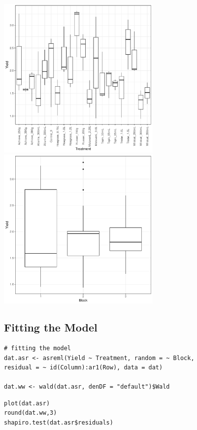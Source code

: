 \documentclass[a4paper, 10pt, fleqn, twosided]{memoir}
\begin{document}
\begin{tcolorbox}[title = Example 6 Boxplots]
\includegraphics[width=0.6\textwidth, frame]{example6_Treatboxplot.pdf}
\tcblower
\includegraphics[width=0.6\textwidth, frame]{example6_Blockboxplot.pdf}
\end{tcolorbox}


\subsection{Fitting the Model}

\begin{tcolorbox}[title = Fitting the linear model for a Split-plot Design]
\begin{verbatim}
# fitting the model
dat.asr <- asreml(Yield ~ Treatment, random = ~ Block,
residual = ~ id(Column):ar1(Row), data = dat)

dat.ww <- wald(dat.asr, denDF = "default")$Wald

\end{verbatim}

\tcblower
\begin{verbatim}
plot(dat.asr)
round(dat.ww,3)
shapiro.test(dat.asr$residuals)
\end{verbatim}
\end{tcolorbox}
\end{document}
